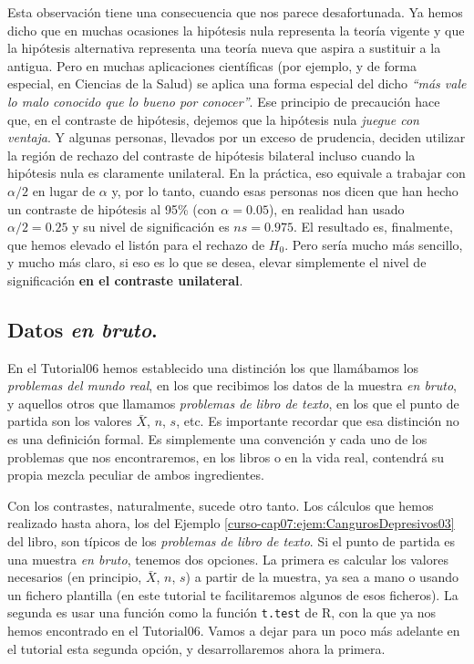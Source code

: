\documentclass[10pt,a4paper]{article}\usepackage[]{graphicx}\usepackage[]{color}
\newcounter {cont01}
\begin{document}
Esta observación tiene una consecuencia que nos parece desafortunada. Ya hemos dicho que en muchas ocasiones la hipótesis nula representa la teoría vigente y  que la hipótesis alternativa representa una teoría nueva que aspira a sustituir a la antigua. Pero en muchas aplicaciones científicas (por ejemplo, y de forma especial, en Ciencias de la Salud) se aplica una forma especial del dicho {\em ``más vale lo malo conocido que lo bueno por conocer''}. Ese principio de precaución hace que, en el contraste de hipótesis, dejemos que la hipótesis nula {\em juegue con ventaja}. Y algunas personas, llevados por un exceso de prudencia, deciden utilizar la región de rechazo del contraste de hipótesis bilateral incluso cuando la hipótesis nula es claramente unilateral. En la práctica, eso equivale a trabajar con $\alpha/2$ en lugar de $\alpha$ y, por lo tanto, cuando esas personas nos dicen que han hecho un contraste de hipótesis al 95\% (con $\alpha=0.05$), en realidad han usado $\alpha/2 = 0.25$  y su nivel de significación es $ns=0.975$. El resultado es, finalmente, que hemos elevado el listón para el rechazo de $H_0$. Pero sería mucho más sencillo, y mucho más claro, si eso es lo que se desea, elevar simplemente el nivel de significación {\bf en el contraste unilateral}.

\subsection{Datos {\em en bruto}.}

En el Tutorial06 hemos establecido una distinción los que llamábamos los {\em problemas del mundo real}, en los que recibimos los datos de la muestra {\em en bruto}, y aquellos otros que llamamos {\em problemas de libro de texto}, en los que el punto de partida son los valores $\bar X$, $n$, $s$, etc. Es importante recordar que esa distinción no es una definición formal. Es simplemente una convención y cada uno de los problemas que nos encontraremos, en los libros o en la vida real, contendrá su propia mezcla peculiar de ambos ingredientes.

Con los contrastes, naturalmente, sucede otro tanto. Los cálculos que hemos realizado hasta ahora, los del Ejemplo \ref{curso-cap07:ejem:CangurosDepresivos03} del libro, son típicos de los {\em problemas de libro de texto}. Si el punto de partida es una muestra {\em en bruto}, tenemos dos opciones. La primera es calcular los valores necesarios (en principio, $\bar X$, $n$, $s$) a partir de la muestra, ya sea a mano o usando un fichero plantilla (en este tutorial te facilitaremos algunos de esos ficheros). La segunda es usar una función como la función {\tt t.test} de R, con la que ya nos hemos encontrado en el Tutorial06. Vamos a dejar para un poco más adelante en el tutorial esta segunda opción, y desarrollaremos ahora la primera.
\end{document}
